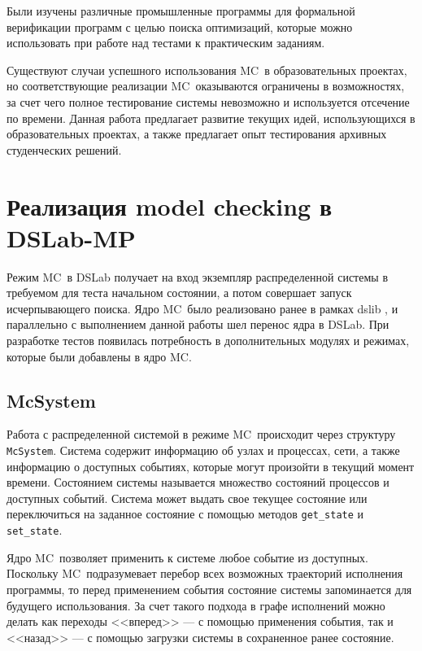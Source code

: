 \documentclass[a4paper,12pt]{extarticle}
\newcommand{\mc}[0]{MC}
\begin{document}
Были изучены различные промышленные программы для формальной верификации программ с целью поиска оптимизаций, которые можно использовать при работе над тестами к практическим заданиям.

Существуют случаи успешного использования \mc\ в образовательных проектах, но соответствующие реализации \mc\ оказываются ограничены в возможностях, за счет чего полное тестирование системы невозможно и используется отсечение по времени.
Данная работа предлагает развитие текущих идей, использующихся в образовательных проектах, а также предлагает опыт тестирования архивных студенческих решений. 



\section{Реализация model checking в DSLab-MP}
\label{CHAPTER3}

Режим \mc\ в DSLab получает на вход экземпляр распределенной системы в требуемом для теста начальном состоянии, а потом совершает запуск исчерпывающего поиска.
Ядро \mc\ было реализовано ранее в рамках dslib \cite{b10}, и параллельно с выполнением данной работы шел перенос ядра в DSLab.
При разработке тестов появилась потребность в дополнительных модулях и режимах, которые были добавлены в ядро \mc.


\subsection{McSystem}

Работа с распределенной системой в режиме \mc\ происходит через структуру \texttt{McSystem}.
Система содержит информацию об узлах и процессах, сети, а также информацию о доступных событиях, которые могут произойти в текущий момент времени.
Состоянием системы называется множество состояний процессов и доступных событий.
Система может выдать свое текущее состояние или переключиться на заданное состояние с помощью методов \texttt{get\_state} и \texttt{set\_state}.

Ядро \mc\ позволяет применить к системе любое событие из доступных.
Поскольку \mc\ подразумевает перебор всех возможных траекторий исполнения программы, то перед применением события состояние системы запоминается для будущего использования.
За счет такого подхода в графе исполнений можно делать как переходы <<вперед>> --- с помощью применения события, так и <<назад>> --- с помощью загрузки системы в сохраненное ранее состояние.
\end{document}
